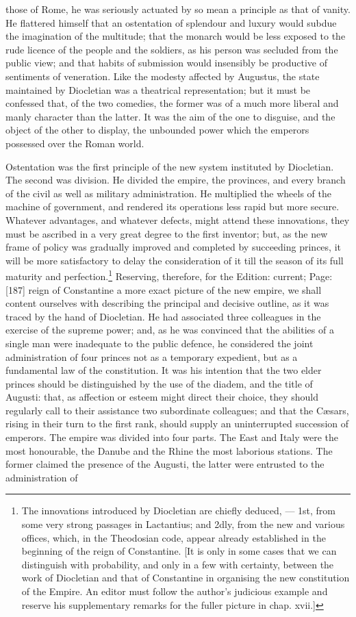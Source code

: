 those of Rome, he was seriously actuated by so mean a principle as that of vanity. He flattered himself that an ostentation of splendour and luxury would subdue the imagination of the multitude; that the monarch would be less exposed to the rude licence of the people and the soldiers, as his person was secluded from the public view; and that habits of submission would insensibly be productive of sentiments of veneration. Like the modesty affected by Augustus, the state maintained by Diocletian was a theatrical representation; but it must be confessed that, of the two comedies, the former was of a much more liberal and manly character than the latter. It was the aim of the one to disguise, and the object of the other to display, the unbounded power which the emperors possessed over the Roman world.

Ostentation was the first principle of the new system instituted by Diocletian. The second was division. He divided the empire, the provinces, and every branch of the civil as well as military administration. He multiplied the wheels of the machine of government, and rendered its operations less rapid but more secure. Whatever advantages, and whatever defects, might attend these innovations, they must be ascribed in a very great degree to the first inventor; but, as the new frame of policy was gradually improved and completed by succeeding princes, it will be more satisfactory to delay the consideration of it till the season of its full maturity and perfection.\footnote{The innovations introduced by Diocletian are chiefly deduced, \texthebrew{—} 1st, from some very strong passages in Lactantius; and 2dly, from the new and various offices, which, in the Theodosian code, appear already established in the beginning of the reign of Constantine. [It is only in some cases that we can distinguish with probability, and only in a few with certainty, between the work of Diocletian and that of Constantine in organising the new constitution of the Empire. An editor must follow the author\texthebrew{}’s judicious example and reserve his supplementary remarks for the fuller picture in chap. xvii.]} Reserving, therefore, for the Edition: current; Page: [187] reign of Constantine a more exact picture of the new empire, we shall content ourselves with describing the principal and decisive outline, as it was traced by the hand of Diocletian. He had associated three colleagues in the exercise of the supreme power; and, as he was convinced that the abilities of a single man were inadequate to the public defence, he considered the joint administration of four princes not as a temporary expedient, but as a fundamental law of the constitution. It was his intention that the two elder princes should be distinguished by the use of the diadem, and the title of Augusti: that, as affection or esteem might direct their choice, they should regularly call to their assistance two subordinate colleagues; and that the Cæsars, rising in their turn to the first rank, should supply an uninterrupted succession of emperors. The empire was divided into four parts. The East and Italy were the most honourable, the Danube and the Rhine the most laborious stations. The former claimed the presence of the Augusti, the latter were entrusted to the administration of 